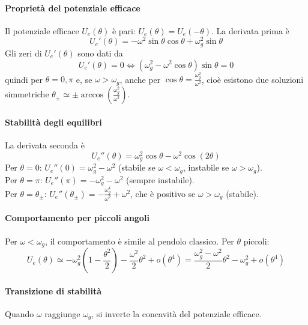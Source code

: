 \begin{example}
    \paragraph{Proprietà del potenziale efficace}
    Il potenziale efficace $U_e(\theta)$ è pari: $U_e(\theta) = U_e(-\theta)$. La derivata prima è
    \[
    U_e'(\theta) = -\omega^2 \sin\theta \cos\theta + \omega_g^2 \sin\theta
    \]
    Gli zeri di $U_e'(\theta)$ sono dati da
    \[
    U_e'(\theta) = 0 \iff (\omega_g^2 - \omega^2 \cos\theta)\sin\theta = 0
    \]
    quindi per $\theta = 0, \pi$ e, se $\omega > \omega_g$, anche per $\cos\theta = \frac{\omega_g^2}{\omega^2}$, cioè esistono due soluzioni simmetriche $\theta_\pm \simeq \pm \arccos\left(\frac{\omega_g^2}{\omega^2}\right)$.

    \paragraph{Stabilità degli equilibri}
    La derivata seconda è
    \[
    U_e''(\theta) = \omega_g^2 \cos\theta - \omega^2 \cos(2\theta)
    \]
    Per $\theta = 0$: $U_e''(0) = \omega_g^2 - \omega^2$ (stabile se $\omega < \omega_g$, instabile se $\omega > \omega_g$).\\
    Per $\theta = \pi$: $U_e''(\pi) = -\omega_g^2 - \omega^2$ (sempre instabile).\\
    Per $\theta = \theta_\pm$: $U_e''(\theta_\pm) = -\frac{\omega_g^4}{\omega^2} + \omega^2$, che è positivo se $\omega > \omega_g$ (stabile).

    \paragraph{Comportamento per piccoli angoli}
    Per $\omega < \omega_g$, il comportamento è simile al pendolo classico. Per $\theta$ piccoli:
    \[
    U_e(\theta) \simeq -\omega_g^2\left(1 - \frac{\theta^2}{2} \right) - \frac{\omega^2}{2} \theta^2 + o(\theta^4)
    = \frac{\omega^2_g-\omega^2}{2}\theta^2 -\omega^2_g +o(\theta^4)
    \]

    \paragraph{Transizione di stabilità}
    Quando $\omega$ raggiunge $\omega_g$, si inverte la concavità del potenziale efficace.


\end{example}
